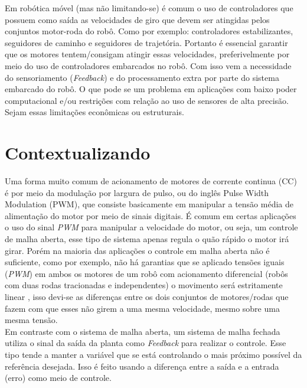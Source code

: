 Em robótica móvel (mas não limitando-se) é comum o uso de controladores que possuem como saída as velocidades de giro que devem ser atingidas pelos conjuntos motor-roda do robô. Como por exemplo: controladores estabilizantes, seguidores de caminho e seguidores de trajetória. Portanto é essencial garantir que os motores tentem/consigam atingir essas velocidades, preferivelmente por meio do uso de controladores embarcados no robô. Com isso vem a necessidade do sensoriamento (\emph{Feedback}) e do processamento extra por parte do sistema embarcado do robô. O que pode se um problema em aplicações com baixo poder computacional e/ou restrições com relação ao uso de sensores de alta precisão. Sejam essas limitações econômicas ou estruturais.\\

\section{Contextualizando}
\label{sec:contextualizando}
Uma forma muito comum de acionamento de motores de corrente continua (CC) é por meio da modulação por largura de pulso, ou do inglês Pulse Width Modulation (PWM), que consiste basicamente em manipular a tensão média de alimentação do motor por meio de sinais digitais. É comum em certas aplicações o uso do sinal \emph{PWM} para manipular a velocidade do motor, ou seja, um controle de malha aberta, esse tipo de sistema apenas regula o quão rápido o motor irá girar. Porém na maioria das aplicações o controle em malha aberta não é suficiente, como por exemplo, não há garantias que se aplicado tensões iguais (\emph{PWM}) em ambos os motores de um robô com acionamento diferencial (robôs com duas rodas tracionadas e independentes) o movimento será estritamente linear \cite{simple_speed_feedback}, isso devi-se as diferenças entre os dois conjuntos de motores/rodas que fazem com que esses não girem a uma mesma velocidade, mesmo sobre uma mesma tensão.\\

Em contraste com o sistema de malha aberta, um sistema de malha fechada utiliza o sinal da saída da planta como \emph{Feedback} para realizar o controle. Esse tipo tende a manter a variável que se está controlando o mais próximo possível da referência desejada. Isso é feito usando a diferença entre a saída e a entrada (erro) como meio de controle. \\ %

